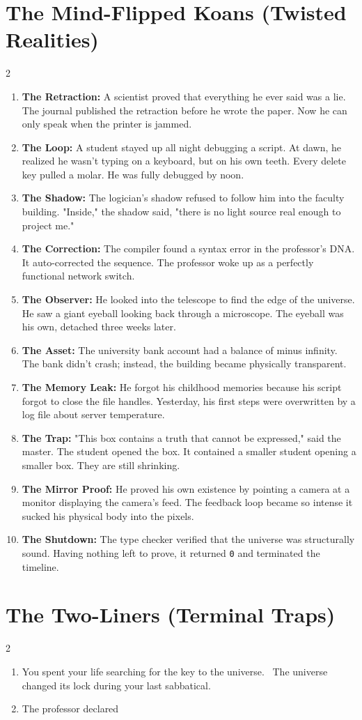 \documentclass[12pt,a4paper]{article}
\begin{document}
\section{The Mind-Flipped Koans (Twisted Realities)}
\begin{multicols}{2}\begin{enumerate}
\item \textbf{The Retraction:} A scientist proved that everything he ever said was a lie. The journal published the retraction before he wrote the paper. Now he can only speak when the printer is jammed.\item \textbf{The Loop:} A student stayed up all night debugging a script. At dawn, he realized he wasn't typing on a keyboard, but on his own teeth. Every delete key pulled a molar. He was fully debugged by noon.\item \textbf{The Shadow:} The logician's shadow refused to follow him into the faculty building. "Inside," the shadow said, "there is no light source real enough to project me."\item \textbf{The Correction:} The compiler found a syntax error in the professor's DNA. It auto-corrected the sequence. The professor woke up as a perfectly functional network switch.\item \textbf{The Observer:} He looked into the telescope to find the edge of the universe. He saw a giant eyeball looking back through a microscope. The eyeball was his own, detached three weeks later.\item \textbf{The Asset:} The university bank account had a balance of minus infinity. The bank didn't crash; instead, the building became physically transparent.\item \textbf{The Memory Leak:} He forgot his childhood memories because his script forgot to close the file handles. Yesterday, his first steps were overwritten by a log file about server temperature.\item \textbf{The Trap:} "This box contains a truth that cannot be expressed," said the master. The student opened the box. It contained a smaller student opening a smaller box. They are still shrinking.\item \textbf{The Mirror Proof:} He proved his own existence by pointing a camera at a monitor displaying the camera's feed. The feedback loop became so intense it sucked his physical body into the pixels.\item \textbf{The Shutdown:} The type checker verified that the universe was structurally sound. Having nothing left to prove, it returned \texttt{0} and terminated the timeline.\end{enumerate}\end{multicols}\section{The Two-Liners (Terminal Traps)}\begin{multicols}{2}\begin{enumerate}\item You spent your life searching for the key to the universe. \ The universe changed its lock during your last sabbatical.\item The professor declared 
\end{enumerate}
\end{multicols}
\end{document}
